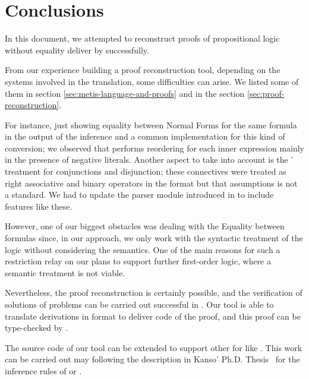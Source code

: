 \documentclass[main.tex]{subfiles}
\begin{document}

\section{Conclusions}
\label{sec:conclusions}

In this document, we attempted to reconstruct proofs
of propositional logic without equality deliver by \Metis successfully.

From our experience building a proof reconstruction tool, depending 
on the systems involved in the translation, some difficulties can 
arise. We listed some of them in section
\ref{sec:metis-language-and-proofs} and in the section
\ref{sec:proof-reconstruction}.

For instance, just showing equality between Normal Forms for the
same formula in the output of the \canonicalize inference and a
common implementation for this kind of conversion; we observed that
\Metis performs reordering for each inner expression mainly in the
presence of negative literals. Another aspect to take into account
is the \Metis' treatment for conjunctions and disjunction;
these connectives were treated as right associative and binary
operators in the \TSTP format but that assumptions is not a standard.
We had to update the \TSTP parser module introduced in
\cite{Gomez-Londono2015} to include features like these.

However, one of our biggest obstacles
was dealing with
the Equality between formulas since, in our approach, we only work
with the syntactic treatment of the logic without considering the
semantics.
One of the main reasons for such a restriction relay on our plans to
support further first-order logic, where a semantic treatment is not
viable.

Nevertheless, the proof reconstruction is certainly possible, and
the verification of solutions of \CPL problems can be carried out
successful in \Agda. Our tool is able to translate \Metis
derivations in \TSTP format to deliver \Agda code of the proof,
and this proof can be type-checked by \Agda.

The source code of our tool can be extended to support
other \ATPs for \CPL like . This work can be carried out
may following the description in Kanso' Ph.D. Thesis~\cite{Kanso2012}
for the inference rules of  or .
\end{document}
